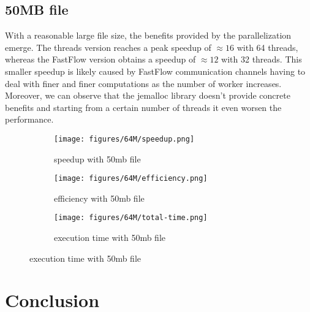 \documentclass{report}
\begin{document}
\section{50MB file}
With a reasonable large file size, the benefits provided by the parallelization emerge.
The threads version reaches a peak speedup of $\approx 16$ with 64 threads,
whereas the FastFlow version obtains a speedup of $\approx 12$ with 32 threads.
This smaller speedup is likely caused by FastFlow communication channels having to deal with finer and
finer computations as the number of worker increases.
Moreover, we can observe that the jemalloc library doesn't provide concrete benefits
and starting from a certain number of threads it even worsen the performance.
\begin{figure}[H]
    \begin{subfigure}{0.5\textwidth}
        \centering
        \texttt{[image: figures/64M/speedup.png]}
        \caption{speedup with 50mb file}
    \end{subfigure}
    \begin{subfigure}{0.5\textwidth}
        \centering
        \texttt{[image: figures/64M/efficiency.png]}
        \caption{efficiency with 50mb file}
    \end{subfigure}
    \begin{subfigure}{0.5\textwidth}
        \centering
        \texttt{[image: figures/64M/total-time.png]}
        \caption{execution time with 50mb file}
    \end{subfigure}
\end{figure}


\chapter{Conclusion}
\end{document}
